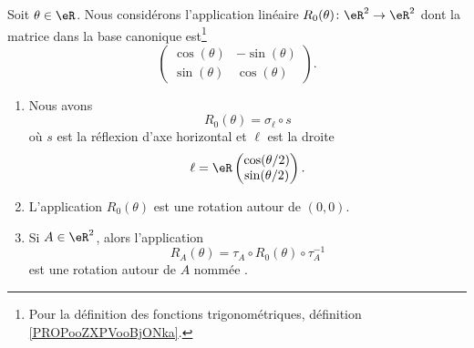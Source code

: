 \begin{lemmaDef}        \label{DEFooADTDooKIZbrw}
    Soit \( \theta\in \eR\). Nous considérons l'application linéaire \( R_0(\theta)\colon \eR^2\to \eR^2\) dont la matrice dans la base canonique est\footnote{Pour la définition des fonctions trigonométriques, définition \ref{PROPooZXPVooBjONka}.}
	\begin{equation}
		\begin{pmatrix}
			\cos(\theta) & -\sin(\theta) \\
			\sin(\theta) & \cos(\theta)
		\end{pmatrix}.
	\end{equation}
	\begin{enumerate}
		\item       \label{ITEMooIEKJooZfsAui}
		      Nous avons
		      \begin{equation}        \label{EQooEVCTooBpTDDq}
			      R_0(\theta)=\sigma_{\ell}\circ s
		      \end{equation}
		      où \( s\) est la réflexion d'axe horizontal et \( \ell\) est la droite
		      \begin{equation}
			      \ell=\eR\begin{pmatrix}
				      \cos(\theta/2) \\
				      \sin(\theta/2)
			      \end{pmatrix}.
		      \end{equation}
		\item       \label{ITEMooBEYOooMHRRYk}
		      L'application \( R_0(\theta)\) est une rotation autour de \( (0,0)\).
		\item     \label{ITEMooEQPAooQcsYfj}
		      Si \( A\in \eR^2\), alors l'application
		      \begin{equation}
			      R_A(\theta)=\tau_A\circ R_0(\theta)\circ \tau_A^{-1}
		      \end{equation}
		      est une rotation autour de \( A\) nommée .
	\end{enumerate}
\end{lemmaDef}

